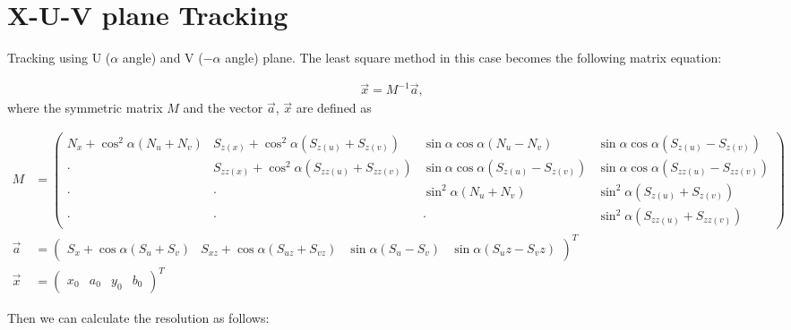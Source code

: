\section{X-U-V plane Tracking}
Tracking using U ($\alpha$ angle) and V ($-\alpha$ angle) plane. The least square method in this case becomes the following matrix equation:

\begin{align}
    \vec{x} = M^{-1} \vec{a},
\end{align}
where the symmetric matrix $M$ and the vector $\vec{a}$, $\vec{x}$ are defined as

\begin{adjustwidth}{-2.5cm}{-1.5cm}    
\begin{align}
    M &= \begin{pmatrix}
            N_x + \cos^2 \alpha (N_u + N_v) & S_{z(x)} + \cos^2 \alpha (S_{z(u)} + S_{z(v)}) & \sin \alpha \cos \alpha (N_u - N_v) & \sin \alpha \cos \alpha (S_{z(u)} - S_{z(v)}) \\
            \cdot & S_{zz(x)} + \cos^2 \alpha (S_{zz(u)} + S_{zz(v)}) & \sin \alpha \cos \alpha (S_{z(u)} - S_{z(v)}) & \sin \alpha \cos \alpha (S_{zz(u)} - S_{zz(v)}) \\
            \cdot & \cdot & \sin^2 \alpha (N_u + N_v) & \sin^2 \alpha (S_{z(u)} + S_{z(v)}) \\
            \cdot & \cdot & \cdot & \sin^2 \alpha (S_{zz(u)} + S_{zz(v)})
        \end{pmatrix} \\
    \vec{a} &= \begin{pmatrix}
            S_x + \cos \alpha (S_u + S_v) & S_{xz} + \cos \alpha (S_{uz} + S_{vz}) &
            \sin \alpha (S_u - S_v) & \sin \alpha (S_uz - S_vz)
        \end{pmatrix}^T \\
    \vec{x} &= \begin{pmatrix}
            x_0 & a_0 & y_0 & b_0
        \end{pmatrix}^T
\end{align}
\end{adjustwidth}

Then we can calculate the resolution as follows:

